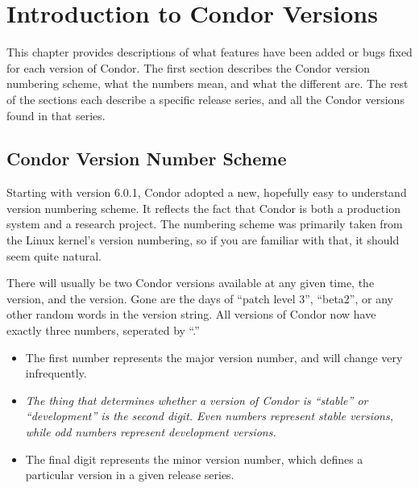 \section{\label{sec:History-Intro}Introduction to Condor Versions}

This chapter provides descriptions of what features have been added or
bugs fixed for each version of Condor.
The first section describes the Condor version numbering scheme, what
the numbers mean, and what the different  are.
The rest of the sections each describe a specific release series, and
all the Condor versions found in that series.

\subsection{\label{sec:Version-Number-Scheme}
Condor Version Number Scheme}

Starting with version 6.0.1, Condor adopted a new, hopefully easy to
understand version numbering scheme.
It reflects the fact that Condor is both a production system and a
research project.
The numbering scheme was primarily taken from the Linux kernel's
version numbering, so if you are familiar with that, it should seem
quite natural.

There will usually be two Condor versions available at any given time,
the  version, and the  version.
Gone are the days of ``patch level 3'', ``beta2'', or any other random
words in the version string.
All versions of Condor now have exactly three numbers, seperated by
``.''   

\begin{itemize}

\item The first number represents the major version number, and will
change very infrequently.

\item \emph{The thing that determines whether a version of Condor is
``stable'' or ``development'' is the second digit.
Even numbers represent stable versions, while odd numbers represent
development versions.}

\item The final digit represents the minor version number, which
defines a particular version in a given release series.

\end{itemize}


